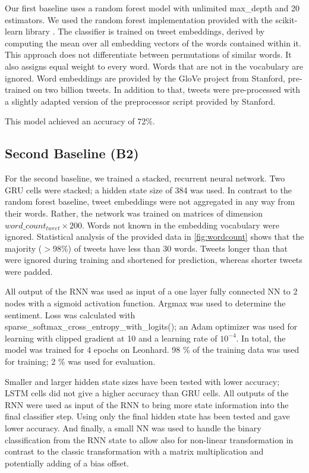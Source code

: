\documentclass[10pt,conference,compsocconf]{IEEEtran}
\begin{document}
Our first baseline uses a random forest model with unlimited
max\_depth and 20 estimators. We used the random forest implementation
provided with the scikit-learn library \cite{scikit-learn}.
The classifier is trained on tweet embeddings,
derived by computing the mean over all embedding
vectors of the words contained within it. This approach does not
differentiate between permutations of similar words. It also assigns
equal weight to every word. Words that are not in the vocabulary are
ignored. Word embeddings are provided by the GloVe \cite{glove}
project from Stanford, pre-trained on two billion tweets. In addition
to that, tweets were pre-processed with a slightly adapted version of
the preprocessor script provided by Stanford.

This model achieved an accuracy of 72\%.


\subsection{Second Baseline (B2)}

For the second baseline, we trained a stacked, recurrent neural
network. Two GRU cells were stacked; a hidden state size of 384 was used.
In contrast to the random forest baseline, tweet embeddings
were not aggregated in any way from their words. Rather, the network
was trained on matrices of dimension \(word\_count_{tweet} \times 200\).
Words not known in the embedding vocabulary were ignored.
Statistical analysis of the provided data in \autoref{fig:wordcount} shows that
the majority ($>$98\%) of tweets have less than 30 words.
Tweets longer than that were ignored during training and shortened for prediction,
whereas shorter tweets were padded.

All output of the RNN was used as input of a one layer fully connected NN to 2 nodes with a sigmoid activation function.
Argmax was used to determine the sentiment. Loss was calculated with sparse\_softmax\_cross\_entropy\_with\_logits(); an Adam optimizer was used for learning with clipped gradient at 10 and a learning rate of $10^{-4}$. In total, the model was trained for 4 epochs on Leonhard.
98 \% of the training data was used for training; 2 \% was used for evaluation.

Smaller and larger hidden state sizes have been tested with lower accuracy; LSTM cells did not give a higher accuracy than GRU cells.
All outputs of the RNN were used as input of the RNN to bring more state information into the final classifier step. Using only the final hidden state has been tested and gave lower accuracy.
And finally, a small NN was used to handle the binary classification from the RNN state to allow also for non-linear transformation in contrast to the classic transformation with a matrix multiplication and potentially adding of a bias offset.
\end{document}
